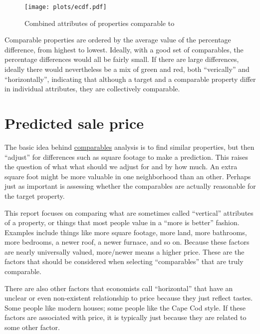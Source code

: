 \documentclass[
12pt, %
letterpaper, %
oneside, %
headinclude,footinclude, %
BCOR5mm, %
]{scrartcl}
\begin{document}
\begin{figure}
\centering
\caption{Combined attributes of properties comparable to \PropertyName{}} \label{fig:ecdf}  
\texttt{[image: plots/ecdf.pdf]} 
\end{figure}

Comparable properties are ordered by the average value of the percentage difference, from highest to lowest.
Ideally, with a good set of comparables, the percentage differences would all be fairly small.
If there are large differences, ideally there would nevertheless be a mix of green and red, both ``verically'' and ``horizontally'', indicating that although a target and a comparable property differ in individual attributes, they are collectively comparable.


\section{Predicted sale price}
The basic idea behind \href{https://en.wikipedia.org/wiki/Comparables}{comparables} analysis is to find similar properties, but then ``adjust'' for differences such as square footage to make a prediction.
This raises the question of what what should we adjust for and by how much.
An extra square foot might be more valuable in one neighborhood than an other. 
Perhaps just as important is assessing whether the comparables are actually reasonable for the target property. 

This report focuses on comparing what are sometimes called ``vertical'' attributes of a property, or things that most people value in a ``more is better'' fashion.
Examples include things like more square footage, more land, more bathrooms, more bedrooms, a newer roof, a newer furnace, and so on.
Because these factors are nearly universally valued, more/newer means a higher price.
These are the factors that should be considered when selecting ``comparables'' that are truly comparable. 

There are also other factors that economists call ``horizontal'' that have an unclear or even non-existent relationship to price because they just reflect tastes.
Some people like modern houses; some people like the Cape Cod style.
If these factors are associated with price, it is typically just because they are related to some other factor.
\end{document}
